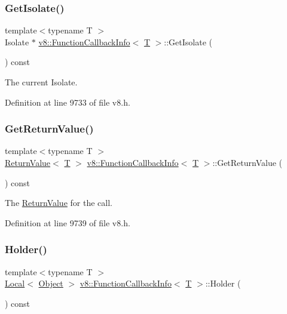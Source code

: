 \subsubsection{\texorpdfstring{Get\+Isolate()}{GetIsolate()}}
{\footnotesize\ttfamily template$<$typename T $>$ \\
Isolate $\ast$ \mbox{\hyperlink{classv8_1_1FunctionCallbackInfo}{v8\+::\+Function\+Callback\+Info}}$<$ \mbox{\hyperlink{classv8_1_1internal_1_1torque_1_1T}{T}} $>$\+::Get\+Isolate (\begin{DoxyParamCaption}{ }\end{DoxyParamCaption}) const}

The current Isolate. 

Definition at line 9733 of file v8.\+h.

\mbox{\label{classv8_1_1FunctionCallbackInfo_a2cb41afe1e098a46d27d901b4cc1e6f5}} 
\subsubsection{\texorpdfstring{Get\+Return\+Value()}{GetReturnValue()}}
{\footnotesize\ttfamily template$<$typename T $>$ \\
\mbox{\hyperlink{classv8_1_1ReturnValue}{Return\+Value}}$<$ \mbox{\hyperlink{classv8_1_1internal_1_1torque_1_1T}{T}} $>$ \mbox{\hyperlink{classv8_1_1FunctionCallbackInfo}{v8\+::\+Function\+Callback\+Info}}$<$ \mbox{\hyperlink{classv8_1_1internal_1_1torque_1_1T}{T}} $>$\+::Get\+Return\+Value (\begin{DoxyParamCaption}{ }\end{DoxyParamCaption}) const}

The \mbox{\hyperlink{classv8_1_1ReturnValue}{Return\+Value}} for the call. 

Definition at line 9739 of file v8.\+h.

\mbox{\label{classv8_1_1FunctionCallbackInfo_a708ab465862ed796e3b0b3c37ba05044}} 
\subsubsection{\texorpdfstring{Holder()}{Holder()}}
{\footnotesize\ttfamily template$<$typename T $>$ \\
\mbox{\hyperlink{classv8_1_1Local}{Local}}$<$ \mbox{\hyperlink{classv8_1_1Object}{Object}} $>$ \mbox{\hyperlink{classv8_1_1FunctionCallbackInfo}{v8\+::\+Function\+Callback\+Info}}$<$ \mbox{\hyperlink{classv8_1_1internal_1_1torque_1_1T}{T}} $>$\+::Holder (\begin{DoxyParamCaption}{ }\end{DoxyParamCaption}) const}

